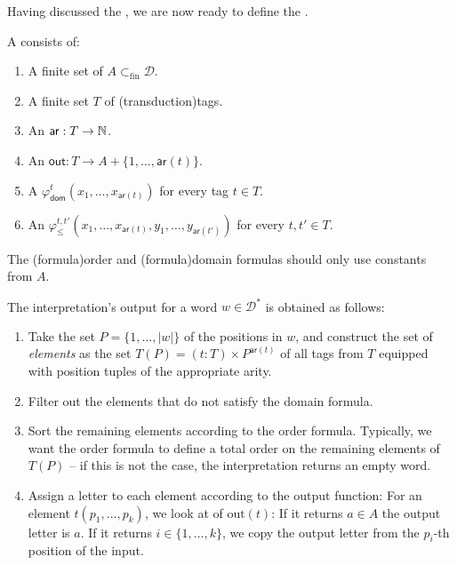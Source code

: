 Having discussed the , we are now ready to
define the .
\begin{definition}
A  consists of:
\begin{enumerate}
\item A finite set of  $A \subset_{\textrm{fin}}\mathcal{D}$.
\item A finite set $T$ of \intro(transduction){tags}.
\item An  $\mathsf{ar} : T \to \mathbb{N}$.
\item An  $\mathsf{out} : T \to A + \{1, \ldots, \mathsf{ar}(t)\}$. 
\item A  $\varphi_{\mathsf{dom}}^t(x_1,\ldots,x_{\mathsf{ar}(t)})$ 
    for every tag $t \in T$.
\item An  $\varphi_{\leq}^{t,t'}(x_1,\ldots,x_{\mathsf{ar}(t)},y_1,\ldots,y_{\mathsf{ar}(t')})$ for every $t,t' \in T$. 
\end{enumerate}
The \kl(formula){order} and \kl(formula){domain} formulas should only use constants from $A$.
\end{definition}
\noindent
The interpretation's output for a word $w \in \mathcal{D}^*$ is obtained as follows:
\begin{enumerate}
    \item  Take the set $P = \{1, \ldots, |w|\}$ of the positions in $w$, and construct the set 
           of \emph{elements} as the set $T(P) = (t : T) \times P^{\mathsf{ar}(t)}$
           of all tags from $T$ equipped with position tuples of the appropriate arity.
    \item Filter out the elements that do not satisfy the domain formula.
    \item Sort the remaining elements according to the order formula. Typically, we 
          want the order formula to define a total order on the remaining elements of $T(P)$ -- 
          if this is not the case, the interpretation returns an empty word.
    \item Assign a letter to each element according to the output function: For an 
          element $t(p_1, \ldots, p_k)$, we look at of $\text{out}(t)$: If it returns $a \in A$
          the output letter is $a$. If it returns $i \in \{1, \ldots, k\}$, we copy the output letter from the
          $p_i$-th position of the input.
          
\end{enumerate}

